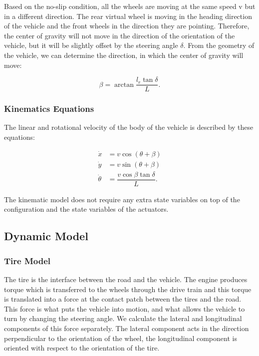 Based on the no-slip condition, all the wheels are moving at the same speed v but in a different direction. The rear virtual wheel is moving in the heading direction of the vehicle and the front wheels in the direction they are pointing. Therefore, the center of gravity will not move in the direction of the orientation of the vehicle, but it will be slightly offset by the steering angle $\delta$. From the geometry of the vehicle, we can determine the direction, in which the center of gravity will move:

\begin{equation}
	\beta=\arctan\dfrac{l_r \tan\delta}{L}.
\end{equation}

\subsubsection{Kinematics Equations}

The linear and rotational velocity of the body of the vehicle is described by these equations:

\begin{equation}
\begin{aligned}
\dot{x}&=v\cos\left(\theta + \beta\right) \\
\dot{y}&=v\sin\left(\theta + \beta\right) \\
\dot{\theta}&=\dfrac{v\cos\beta\tan\delta}{L}.
\end{aligned}
\end{equation}

The kinematic model does not require any extra state variables on top of the configuration and the state variables of the actuators.

\subsection{Dynamic Model}


\subsubsection{Tire Model}

The tire is the interface between the road and the vehicle. The engine produces torque which is transferred to the wheels through the drive train and this torque is translated into a force at the contact patch between the tires and the road. This force is what puts the vehicle into motion, and what allows the vehicle to turn by changing the steering angle. We calculate the lateral and longitudinal components of this force separately. The lateral component acts in the direction perpendicular to the orientation of the wheel, the longitudinal component is oriented with respect to the orientation of the tire.

